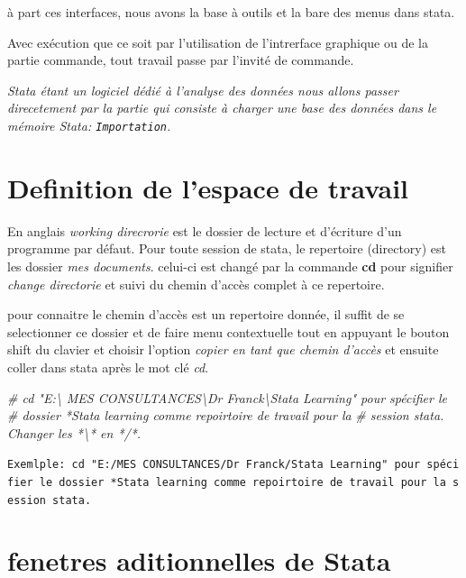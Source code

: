 \documentclass[
]{book}
\newenvironment{Shaded}{\begin{snugshade}}{\end{snugshade}}
\newcommand{\CommentTok}[1]{\textcolor[rgb]{0.56,0.35,0.01}{\textit{#1}}}
\begin{document}
à part ces interfaces, nous avons la base à outils et la bare des menus dans stata.

Avec exécution que ce soit par l'utilisation de l'intrerface graphique ou de la partie commande, tout travail passe par l'invité de commande.

\emph{Stata étant un logiciel dédié à l'analyse des données nous allons passer direcetement par la partie qui consiste à charger une base des données dans le mémoire Stata: \texttt{Importation}.}

\hypertarget{definition-de-lespace-de-travail}{%
\section{Definition de l'espace de travail}\label{definition-de-lespace-de-travail}}

En anglais \emph{working direcrorie} est le dossier de lecture et d'écriture d'un programme par défaut. Pour toute session de stata, le repertoire (directory) est les dossier \emph{mes documents}. celui-ci est changé par la commande \textbf{cd} pour signifier \emph{change directorie} et suivi du chemin d'accès complet à ce repertoire.

pour connaitre le chemin d'accès est un repertoire donnée, il suffit de se selectionner ce dossier et de faire menu contextuelle tout en appuyant le bouton shift du clavier et choisir l'option \emph{copier en tant que chemin d'accès} et ensuite coller dans stata après le mot clé \emph{cd}.

\begin{Shaded}
\begin{Highlighting}[]
  \CommentTok{\# cd "E:\textbackslash{} MES CONSULTANCES\textbackslash{}Dr Franck\textbackslash{}Stata Learning" pour spécifier le }
  \CommentTok{\#  dossier *Stata learning comme repoirtoire de travail pour la }
  \CommentTok{\# session stata. Changer les *\textbackslash{}* en */*.}
\end{Highlighting}
\end{Shaded}

\texttt{Exemlple:\ cd\ "E:/MES\ CONSULTANCES/Dr\ Franck/Stata\ Learning"\ pour\ spécifier\ le\ dossier\ *Stata\ learning\ comme\ repoirtoire\ de\ travail\ pour\ la\ session\ stata.}

\hypertarget{fenetres-aditionnelles-de-stata}{%
\section{fenetres aditionnelles de Stata}\label{fenetres-aditionnelles-de-stata}}
\end{document}
